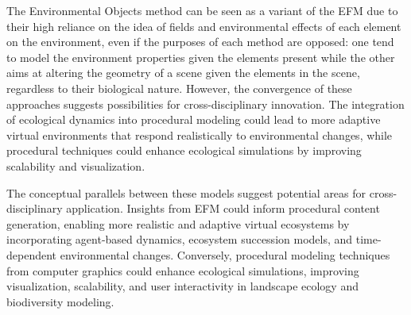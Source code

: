 
The Environmental Objects method can be seen as a variant of the EFM due to their high reliance on the idea of fields and environmental effects of each element on the environment, even if the purposes of each method are opposed: one tend to model the environment properties given the elements present while the other aims at altering the geometry of a scene given the elements in the scene, regardless to their biological nature. However, the convergence of these approaches suggests possibilities for cross-disciplinary innovation. The integration of ecological dynamics into procedural modeling could lead to more adaptive virtual environments that respond realistically to environmental changes, while procedural techniques could enhance ecological simulations by improving scalability and visualization.

The conceptual parallels between these models suggest potential areas for cross-disciplinary application. Insights from EFM could inform procedural content generation, enabling more realistic and adaptive virtual ecosystems by incorporating agent-based dynamics, ecosystem succession models, and time-dependent environmental changes. Conversely, procedural modeling techniques from computer graphics could enhance ecological simulations, improving visualization, scalability, and user interactivity in landscape ecology and biodiversity modeling. 



